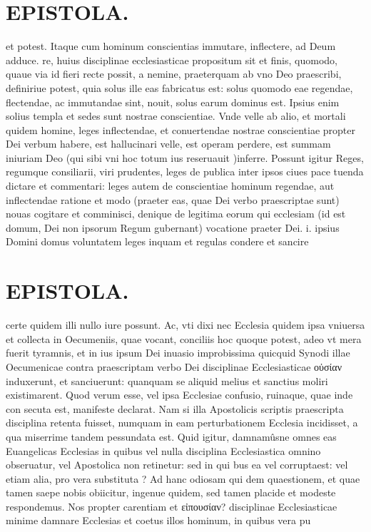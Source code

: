 \documentclass{article}
\begin{document}
\begin{pages}
\section*{EPISTOLA. }\pstart et potest. Itaque cum hominum conscientias immutare, inflectere, ad Deum adduce. re, huius disciplinae ecclesiasticae propositum sit et finis, quomodo, quaue via id fieri recte possit, a nemine, praeterquam ab vno Deo praescribi, definiriue potest, quia solus ille eas fabricatus est: solus quomodo eae regendae, flectendae, ac immutandae sint, nouit, solus earum dominus est. Ipsius enim solius templa et sedes sunt nostrae conscientiae. Vnde velle ab alio, et mortali quidem homine, leges inflectendae, et conuertendae nostrae conscientiae propter Dei verbum habere, est hallucinari velle, est operam perdere, est summam iniuriam Deo (qui sibi vni hoc totum ius reseruauit )inferre. Possunt igitur Reges, regumque consiliarii, viri prudentes, leges de publica inter ipsos ciues pace tuenda dictare et commentari: leges autem de conscientiae hominum regendae, aut inflectendae ratione et modo (praeter eas, quae Dei verbo praescriptae sunt) nouas cogitare et comminisci, denique de legitima eorum qui ecclesiam (id est domum, Dei non ipsorum Regum gubernant) vocatione praeter Dei. i. ipsius Domini domus voluntatem leges inquam et regulas condere et sancire  \pend
\section*{EPISTOLA. }\pstart certe quidem illi nullo iure possunt. Ac, vti dixi nec Ecclesia quidem ipsa vniuersa et collecta in Oecumeniis, quae vocant, conciliis hoc quoque potest, adeo vt mera fuerit tyramnis, et in ius ipsum Dei inuasio improbissima quicquid Synodi illae Oecumenicae contra praescriptam verbo Dei disciplinae Ecclesiasticae οὐσίαν induxerunt, et sanciuerunt: quanquam se aliquid melius et sanctius moliri existimarent. Quod verum esse, vel ipsa Ecclesiae confusio, ruinaque, quae inde con secuta est, manifeste declarat. Nam si illa Apostolicis scriptis praescripta disciplina retenta fuisset, numquam in eam perturbationem Ecclesia incidisset, a qua miserrime tandem pessundata est. Quid igitur, damnamûsne omnes eas Euangelicas Ecclesias in quibus vel nulla disciplina Ecclesiastica omnino obseruatur, vel Apostolica non retinetur: sed in qui bus ea vel corruptaest: vel etiam alia, pro vera substituta ? Ad hanc odiosam qui dem quaestionem, et quae tamen saepe nobis obiicitur, ingenue quidem, sed tamen placide et modeste respondemus. Nos propter carentiam et εἰπουσίαν? disciplinae Ecclesiasticae minime damnare Ecclesias et coetus illos hominum, in quibus vera pu\pend

\end{pages}
\end{document}
